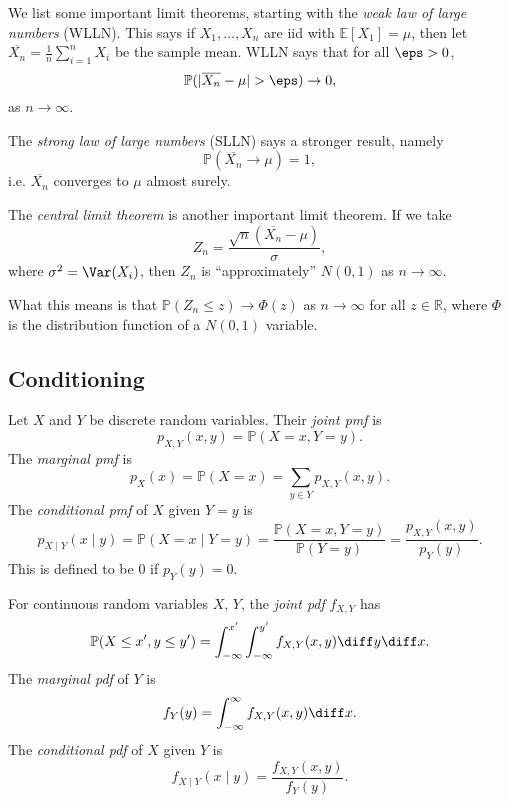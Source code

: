 \documentclass[12pt]{article}
\begin{document}
We list some important limit theorems, starting with the \emph{weak law of large numbers} (WLLN). This says if $X_1, \ldots, X_n$ are iid with $\mathbb{E}[X_1] = \mu$, then let $\overline{X_n} = \frac{1}{n} \sum_{i = 1}^{n}X_i$ be the sample mean. WLLN says that for all $\eps > 0$,
\[
\mathbb{P}(|\overline{X_n} - \mu| > \eps) \to 0
,\]
as $n \to \infty$.

The \emph{strong law of large numbers} (SLLN) says a stronger result, namely
\[
\mathbb{P}(\overline{X_n} \to \mu) = 1
,\]
i.e. $\overline{X_n}$ converges to $\mu$ almost surely.

The \emph{central limit theorem} is another important limit theorem. If we take
\[
Z_n = \frac{\sqrt n (\overline{X_n} - \mu)}{\sigma}
,\]
where $\sigma^2 = \Var(X_i)$, then $Z_n$ is ``approximately'' $N(0,1)$ as $n \to \infty$.

What this means is that $\mathbb{P}(Z_n \leq z) \to \Phi(z)$ as $n \to \infty$ for all $z \in \mathbb{R}$, where $\Phi$ is the distribution function of a $N(0,1)$ variable.

\subsection{Conditioning}
\label{sub:conditioning}

Let $X$ and $Y$ be discrete random variables. Their \emph{joint pmf} is
\[
p_{X,Y}(x, y) = \mathbb{P}(X = x, Y = y)
.\]
The \emph{marginal pmf} is
\[
p_X(x) = \mathbb{P}(X = x) = \sum_{y \in Y}p_{X,Y}(x, y)
.\]
The \emph{conditional pmf} of $X$ given $Y = y$ is
\[
p_{X\mid Y}(x\mid y) = \mathbb{P}(X = x \mid Y = y) = \frac{\mathbb{P}(X = x, Y = y)}{\mathbb{P}(Y = y)} = \frac{p_{X,Y}(x, y)}{p_Y(y)}
.\]
This is defined to be $0$ if $p_Y(y) = 0$.

For continuous random variables $X$, $Y$, the \emph{joint pdf} $f_{X,Y}$ has
\[
\mathbb{P}(X \leq x', y \leq y') = \int_{-\infty}^{x'}\int_{-\infty}^{y'} f_{X,Y}(x,y) \diff y \diff x
.\]
The \emph{marginal pdf} of $Y$ is
\[
f_Y(y) = \int_{-\infty}^{\infty}f_{X,Y}(x,y) \diff x
.\]
The \emph{conditional pdf} of $X$ given $Y$ is
\[
f_{X\mid Y}(x \mid y) = \frac{f_{X,Y}(x, y)}{f_Y(y)}
.\]
\end{document}
